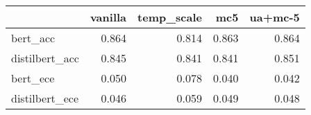 \begin{tabular}{lrrrr}
\toprule
{} &  vanilla &  temp\_scale &    mc5 &  ua+mc-5 \\
\midrule
bert\_acc       &    0.864 &       0.814 &  0.863 &    0.864 \\
distilbert\_acc &    0.845 &       0.841 &  0.841 &    0.851 \\
bert\_ece       &    0.050 &       0.078 &  0.040 &    0.042 \\
distilbert\_ece &    0.046 &       0.059 &  0.049 &    0.048 \\
\bottomrule
\end{tabular}
